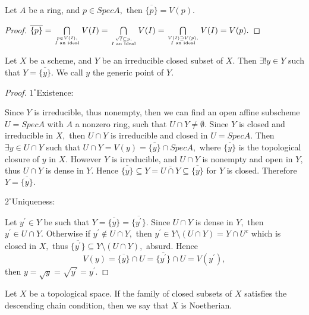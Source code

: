 \begin{lemma}
Let $A$ be a ring, and $p\in SpecA,$  then $\overline{\{p\}}=V(p).$
\end{lemma}
\begin{proof}
$\overline{\{p\}}=\bigcap\limits_{p\in V(I), \atop I \text{ an
ideal}} V(I)=\bigcap\limits_{\sqrt{I}\subseteq p, \atop I \text{ an
ideal}} V(I)=\bigcap\limits_{V(I)\supseteq V(p), \atop I \text{ an
ideal}} V(I)=V(p).$
\end{proof}
\begin{prop}
Let $X$ be a scheme, and $Y$ be an irreducible closed subset of $X.$
Then $\exists ! y\in Y$ such that $Y=\overline{\{y\}}.$ We call $y$
the generic point of $Y.$
\end{prop}
\begin{proof}
$\mathit{1^{\circ}}$Existence:

Since $Y$ is irreducible, thus nonempty, then we can find an open
affine subscheme $U=SpecA$ with $A$ a nonzero ring, such that $U\cap
Y\neq\emptyset.$ Since $Y$ is closed and irreducible in $X,$ then
$U\cap Y$ is irreducible and closed in $U=SpecA.$ Then $\exists y\in
U\cap Y$ such that $U\cap Y=V(y)=\overline{\{y\}}\cap SpecA,$ where
$\overline{\{y\}}$ is the topological closure of $y$ in $X.$ However
$Y$ is irreducible, and $U\cap Y$ is nonempty and open in $Y,$ thus
$U\cap Y$ is dense in $Y.$ Hence $\overline{\{y\}}\subseteq
Y=\overline{U\cap Y}\subseteq\overline{\{y\}}$ for $Y$ is closed.
Therefore $Y=\overline{\{y\}}.$

$\mathit{2^{\circ}}$Uniqueness:

Let $y^{\prime}\in Y$ be such that
$Y=\overline{\{y\}}=\overline{\{y^{\prime}\}}.$ Since $U\cap Y$ is
dense in $Y,$ then $y^{\prime}\in U\cap Y.$ Otherwise if
$y^{\prime}\not\in U\cap Y,$ then $y^{\prime}\in Y\setminus(U\cap
Y)=Y\cap U^c$ which is closed in $X,$ thus
$\overline{\{y^{\prime}\}}\subseteq Y\setminus (U\cap Y),$ absurd.
Hence $$V(y)=\overline{\{y\}}\cap U=\overline{\{y^{\prime}\}}\cap
U=V(y^{\prime}),$$ then $y=\sqrt{y}=\sqrt{y^{\prime}}=y^{\prime}.$
\end{proof}
\begin{Def}
Let $X$ be a topological space. If the family of closed subsets of
$X$ satisfies the descending chain condition, then we say that $X$
is Noetherian.
\end{Def}
